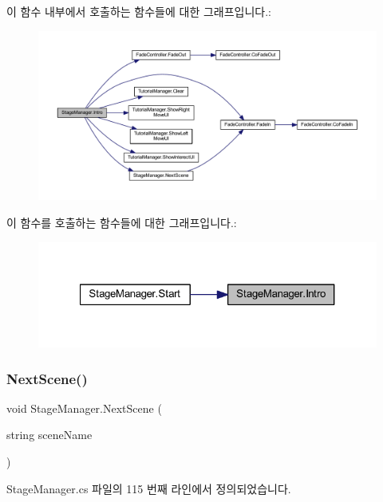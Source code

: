 이 함수 내부에서 호출하는 함수들에 대한 그래프입니다.\+:\nopagebreak
\begin{figure}[H]
\begin{center}
\leavevmode
\includegraphics[width=350pt]{da/de4/class_stage_manager_ae8747a960980738fdf6cbb6f542e69b3_cgraph}
\end{center}
\end{figure}
이 함수를 호출하는 함수들에 대한 그래프입니다.\+:\nopagebreak
\begin{figure}[H]
\begin{center}
\leavevmode
\includegraphics[width=321pt]{da/de4/class_stage_manager_ae8747a960980738fdf6cbb6f542e69b3_icgraph}
\end{center}
\end{figure}
\mbox{\label{class_stage_manager_a10d59cedf36dae5138eb9622088fa3dc}} 
\subsubsection{\texorpdfstring{NextScene()}{NextScene()}}
{\footnotesize\ttfamily void Stage\+Manager.\+Next\+Scene (\begin{DoxyParamCaption}\item[{string}]{scene\+Name }\end{DoxyParamCaption})}



Stage\+Manager.\+cs 파일의 115 번째 라인에서 정의되었습니다.


